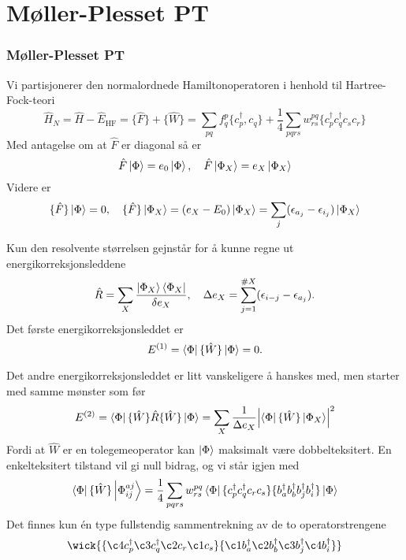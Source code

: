 \documentclass{beamer}
\begin{document}
\section{Møller-Plesset PT}

\begin{frame}
	\frametitle{Møller-Plesset PT}
	Vi partisjonerer den normalordnede Hamiltonoperatoren i henhold til Hartree-Fock-teori
	\begin{equation}
		\hat H_N = \hat H - \hat E_{\text{HF}} = \{\hat F \} + \{ \hat W \} = \sum_{pq}f_q^p \{ c^\dagger_p, c_q\} + \frac{1}{4}\sum_{pqrs}w^{pq}_{rs} \{c^\dagger_p c^\dagger_q c_s c_r \}
	\end{equation}
	Med antagelse om at $\hat F$ er diagonal så er 
	\begin{equation}
		\hat F\ket{\Phi} = e_0 \ket{\Phi}, \quad \hat F \ket{\Phi_X} = e_X \ket{\Phi_X}
	\end{equation}
	Videre er 
	\begin{equation}
		\{\hat F\} \ket{\Phi} = 0, \quad \{\hat F\} \ket{\Phi_X} = (e_X - E_0)\ket{\Phi_X} = \sum_j(\epsilon_{a_j} - \epsilon_{i_j})\ket{\Phi_X}
	\end{equation}
\end{frame}

\begin{frame}
	Kun den resolvente størrelsen gejnstår for å kunne regne ut energikorreksjonsleddene
	\begin{equation}
		\hat R = \sum_{X}\frac{\ket{\Phi_X}\bra{\Phi_X}}{\delta e_X}, \quad \Delta e_X = \sum_{j=1}^{\# X}(\epsilon_{i-j} - \epsilon_{a_j}).
	\end{equation}
	Det første energikorreksjonsleddet er
	\begin{equation}
		E^{(1)} = \bra{\Phi} \{\hat W \} \ket{\Phi} = 0.
	\end{equation}
\end{frame}

\begin{frame}
	Det andre energikorreksjonsleddet er litt vanskeligere å hanskes med, men starter med samme mønster som før
	\begin{equation}
		E^{(2)} = \bra{\Phi}\{\hat W\} \hat R \{\hat W\} \ket{\Phi} = \sum_X \frac{1}{\Delta e_X} \abs{\bra{\Phi}\{\hat W\} \ket{\Phi_X}}^2
	\end{equation}
	Fordi at $\hat W$ er en tolegemeoperator kan $\ket{\Phi}$ maksimalt være dobbelteksitert. En enkelteksitert tilstand vil gi null bidrag, og vi står igjen med
	\begin{align}
		\bra{\Phi} \{\hat W\}\ket{\Phi_{ij}^{aj}} = \frac{1}{4} \sum_{pqrs} w_{rs}^{pq} \bra{\Phi} \{c^\dagger_p c^\dagger_q c_r c_s \} \{b^\dagger_a b^\dagger_b b^\dagger_j b^\dagger_i  \}\ket{\Phi}
	\end{align}
	Det finnes kun én type fullstendig sammentrekning av de to operatorstrengene
	\begin{equation}
		\wick{
		\{\c4 c^\dagger_p \c3 c^\dagger_q \c2 c_r \c1 c_s \} \{ \c1 b^\dagger_a \c2 b^\dagger_b \c3 b^\dagger_j  \c4 b^\dagger_i  \}
		}	
	\end{equation}
\end{frame}
\end{document}
